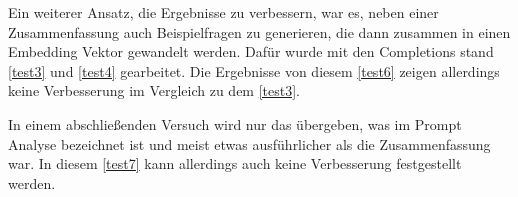 \documentclass[../main.tex]{subfiles}
\begin{document}
Ein weiterer Ansatz, die Ergebnisse zu verbessern, war es, neben einer Zusammenfassung auch Beispielfragen zu generieren, die dann zusammen in einen Embedding Vektor gewandelt werden.
Dafür wurde mit den Completions stand \ref{test3} und \ref{test4} gearbeitet.
Die Ergebnisse von diesem \ref{test6} zeigen allerdings keine Verbesserung im Vergleich zu dem \ref{test3}.

In einem abschließenden Versuch wird nur das übergeben, was im Prompt Analyse bezeichnet ist und meist etwas ausführlicher als die Zusammenfassung war. 
In diesem \ref{test7} kann allerdings auch keine Verbesserung festgestellt werden.
\end{document}
